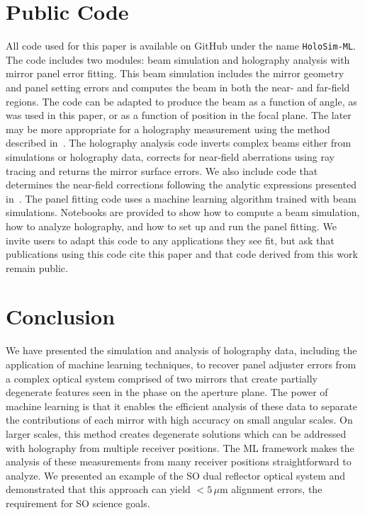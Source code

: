 
\section{Public Code}
\label{sec:code}
All code used for this paper is available on GitHub under the name \verb|HoloSim-ML|. The code includes two modules: beam simulation and holography analysis with mirror panel error fitting.  This beam simulation includes the mirror geometry and panel setting errors and computes the beam in both the near- and far-field regions.  The code can be adapted to produce the beam as a function of angle, as was used in this paper, or as a function of position in the focal plane.  The later may be more appropriate for a holography measurement using the method described in~\cite{fyst_holog}. The holography analysis code inverts complex beams either from simulations or holography data, corrects for near-field aberrations using ray tracing and returns the mirror surface errors.  We also include code that determines the near-field corrections following the analytic expressions presented in~\cite{alma_holog}.  The panel fitting code uses a machine learning algorithm  trained with beam simulations.  Notebooks are provided to show how to compute a beam simulation, how to analyze holography, and how to set up and run the panel fitting.  We invite users to adapt this code to any applications they see fit, but ask that publications using this code cite this paper and that code derived from this work remain public.

\section{Conclusion}
\label{sec:holosim_conclusion}
We have presented the simulation and analysis of holography data, including the application of machine learning techniques, to recover panel adjuster errors from a complex optical system comprised of two mirrors that create partially degenerate features seen in the phase on the aperture plane.  The power of machine learning is that it enables the efficient analysis of these data to separate the contributions of each mirror with high accuracy on small angular scales.  On larger scales, this method creates degenerate solutions which can be addressed with holography from multiple receiver positions.  The ML framework makes the analysis of these measurements from many receiver positions straightforward to analyze.  We presented an example of the SO dual reflector optical system and demonstrated that this approach can yield $<5\,\mu$m alignment errors, the requirement for SO science goals.

